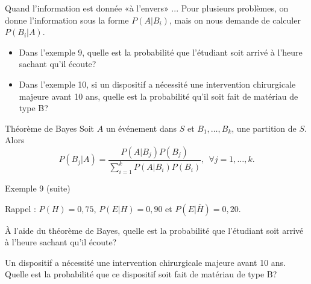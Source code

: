 \documentclass{BeamerTemplate}
\begin{document}
\begin{frame}[t]{Quand l'information est donnée «à l'envers» ...}
 Pour plusieurs problèmes, on donne l'information sous la forme $P(A|B_i)$,
 mais on nous demande de calculer $P(B_i|A)$.

 \begin{itemize}\itemsep 1cm
  \item Dans l'exemple 9, quelle est la probabilité que l'étudiant soit arrivé à l'heure sachant qu'il écoute?
  \item Dans l'exemple 10, si un dispositif a nécessité une intervention chirurgicale majeure avant 10 ans, quelle est la probabilité qu'il soit fait de matériau de type B?
 \end{itemize}
\end{frame}

\begin{frame}[t]%
 \begin{Boite}{Théorème de Bayes}
  Soit $A$ un événement dans $S$ et $B_1,\ldots,B_k$, une partition
  de $S$. Alors
  $$P(B_j|A)=\frac{P(A|B_j)P(B_j)}{\sum_{i=1}^kP(A|B_i)P(B_i)},\ \ \forall j=1,\ldots,k.$$
 \end{Boite}

\end{frame}

\begin{frame}[t]{Exemple 9 (suite)}

Rappel : $P(H)=0,75$, $P(E|H)=0,90$ et $P(E|\overline H)=0,20$.

\bigskip

À l'aide du théorème de Bayes, quelle est la probabilité que l'étudiant soit arrivé à l'heure sachant qu'il écoute?

\end{frame}


\begin{frame}[plain,t]%


\QuizBanner

  \vspace{2mm}
  Un dispositif a nécessité une intervention chirurgicale majeure avant 10 ans. Quelle est la probabilité que ce dispositif soit fait de matériau
  de type B?
 \vspace{5cm}

\end{frame}
\end{document}
